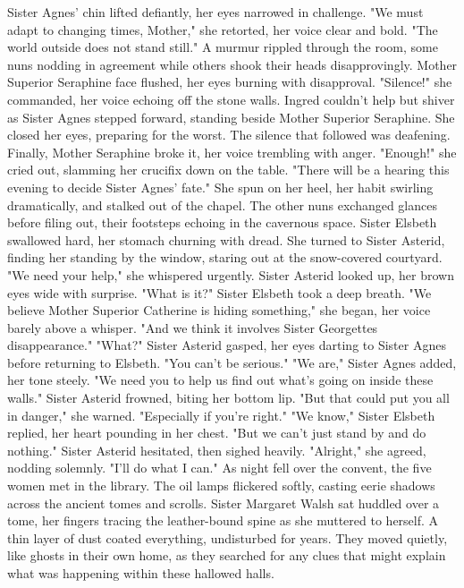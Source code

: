 \documentclass[11pt]{article}
\begin{document}
Sister Agnes' chin lifted defiantly, her eyes narrowed in challenge. "We must adapt to changing times, Mother," she retorted, her voice clear and bold. "The world outside does not stand still."
A murmur rippled through the room, some nuns nodding in agreement while others shook their heads disapprovingly. Mother Superior Seraphine face flushed, her eyes burning with disapproval. "Silence!" she commanded, her voice echoing off the stone walls.
Ingred couldn't help but shiver as Sister Agnes stepped forward, standing beside Mother Superior Seraphine. She closed her eyes, preparing for the worst.
The silence that followed was deafening.
Finally, Mother Seraphine broke it, her voice trembling with anger. "Enough!" she cried out, slamming her crucifix down on the table. "There will be a hearing this evening to decide Sister Agnes' fate." She spun on her heel, her habit swirling dramatically, and stalked out of the chapel. The other nuns exchanged glances before filing out, their footsteps echoing in the cavernous space.
Sister Elsbeth swallowed hard, her stomach churning with dread. She turned to Sister Asterid, finding her standing by the window, staring out at the snow-covered courtyard. "We need your help," she whispered urgently.
Sister Asterid looked up, her brown eyes wide with surprise. "What is it?"
Sister Elsbeth took a deep breath. "We believe Mother Superior Catherine is hiding something," she began, her voice barely above a whisper. "And we think it involves Sister Georgettes disappearance."
"What?" Sister Asterid gasped, her eyes darting to Sister Agnes before returning to Elsbeth. "You can't be serious."
"We are," Sister Agnes added, her tone steely. "We need you to help us find out what's going on inside these walls."
Sister Asterid frowned, biting her bottom lip. "But that could put you all in danger," she warned. "Especially if you're right."
"We know," Sister Elsbeth replied, her heart pounding in her chest. "But we can't just stand by and do nothing."
Sister Asterid hesitated, then sighed heavily. "Alright," she agreed, nodding solemnly. "I'll do what I can."
As night fell over the convent, the five women met in the library. The oil lamps flickered softly, casting eerie shadows across the ancient tomes and scrolls. Sister Margaret Walsh sat huddled over a tome, her fingers tracing the leather-bound spine as she muttered to herself. A thin layer of dust coated everything, undisturbed for years. They moved quietly, like ghosts in their own home, as they searched for any clues that might explain what was happening within these hallowed halls.
\end{document}
